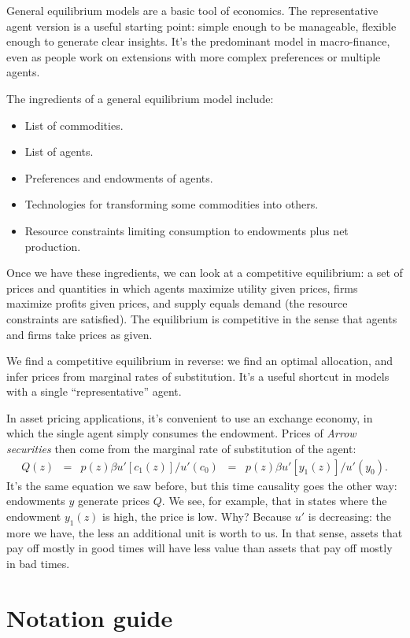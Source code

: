 \documentclass[11pt]{article}
\begin{document}
General equilibrium models are a basic tool of economics.
The representative agent version is a useful starting point:
simple enough to be manageable, flexible enough to generate clear insights.
It's the predominant model in macro-finance,
even as people work on extensions with more complex preferences
or multiple agents.

The ingredients of a general equilibrium model include:
\begin{itemize}
\item List of commodities.
\item List of agents.
\item Preferences and endowments of agents.
\item Technologies for transforming some commodities into others.
\item Resource constraints limiting consumption to endowments plus net production.
\end{itemize}
Once we have these ingredients, we can
look at a competitive equilibrium:
a set of prices and quantities in which
agents maximize utility given prices,
firms maximize profits given prices,
and supply equals demand (the resource constraints are satisfied).
The equilibrium is competitive in the sense that agents and firms
take prices as given.

We find a competitive equilibrium in reverse:
we find an optimal allocation, and infer prices from
marginal rates of substitution.
It's a useful shortcut in models with a single ``representative'' agent.

In asset pricing applications, it's convenient
to use an exchange economy, in which the single agent simply consumes
the endowment.
Prices of {\it Arrow securities\/} then come from the marginal rate of substitution
of the agent:
\begin{eqnarray*}
    Q(z) &=& p(z) \beta u'[c_1(z)]/u'(c_0) \;\;=\;\; p(z) \beta u'[y_1(z)]/u'(y_0) .
\end{eqnarray*}
It's the same equation we saw before, but this time causality goes the
other way:  endowments $y$ generate prices $Q$.
We see, for example, that in states where the endowment $y_1(z)$ is high,
the price is low.
Why?  Because $u'$ is decreasing:  the more we have, the less an additional
unit is worth to us.
In that sense, assets that pay off mostly in good times will have less value
than assets that pay off mostly in bad times.

\section*{Notation guide} 
\end{document}
